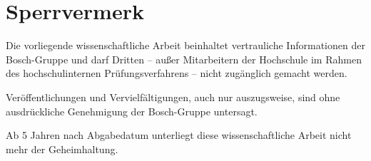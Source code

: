 \chapter*{Sperrvermerk}
\thispagestyle{empty}
Die vorliegende wissenschaftliche Arbeit beinhaltet vertrauliche Informationen der Bosch-Gruppe und darf Dritten
-- außer Mitarbeitern der Hochschule im Rahmen des hochschulinternen Prüfungsverfahrens -- nicht zugänglich gemacht
werden.

Veröffentlichungen und Vervielfältigungen, auch nur auszugsweise, sind ohne ausdrückliche Genehmigung der Bosch-Gruppe
untersagt.

Ab 5 Jahren nach Abgabedatum unterliegt diese wissenschaftliche Arbeit nicht mehr der Geheimhaltung.